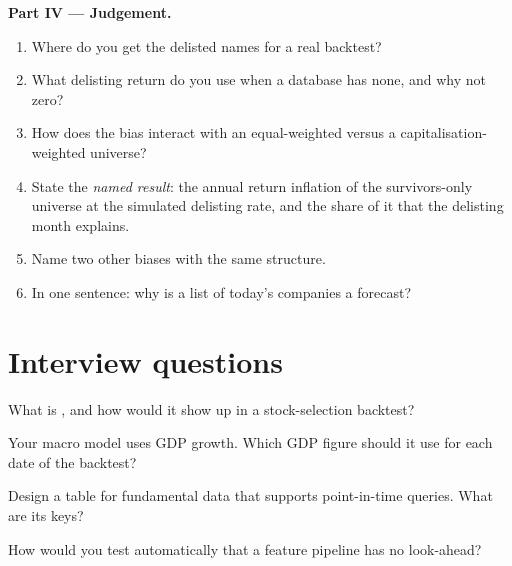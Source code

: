 \begin{problem}
\medskip\noindent\textbf{Part IV --- Judgement.}
\begin{enumerate}[resume]
\item Where do you get the delisted names for a real backtest?
\item What delisting return do you use when a database has none, and why not zero?
\item How does the bias interact with an equal-weighted versus a capitalisation-weighted universe?
\item State the \emph{named result}: the annual return inflation of the survivors-only universe at the simulated delisting rate,
and the share of it that the delisting month explains.
\item Name two other biases with the same structure.
\item In one sentence: why is a list of today's companies a forecast?
\end{enumerate}
\end{problem}

\section{Interview questions}

\begin{interviewq}\label{iq:rs:point-in-time-data-and-the-biases:1}
What is , and how would it show up in a stock-selection backtest?
\end{interviewq}

\begin{interviewq}\label{iq:rs:point-in-time-data-and-the-biases:2}
Your macro model uses GDP growth. Which GDP figure should it use for each date of the backtest?
\end{interviewq}

\begin{interviewq}\label{iq:rs:point-in-time-data-and-the-biases:3}
Design a table for fundamental data that supports point-in-time queries. What are its keys?
\end{interviewq}

\begin{interviewq}\label{iq:rs:point-in-time-data-and-the-biases:4}
How would you test automatically that a feature pipeline has no look-ahead?
\end{interviewq}

